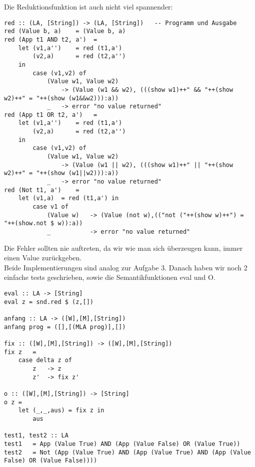\documentclass[11pt,a4paper,ngerman]{article}
\begin{document}
\begin{enumerate}[a)]
            Die Reduktionsfunktion ist auch nicht viel spannender:
            \begin{lstlisting}
red :: (LA, [String]) -> (LA, [String])   -- Programm und Ausgabe
red (Value b, a)    = (Value b, a)
red (App t1 AND t2, a')  =
    let (v1,a'')    = red (t1,a')
        (v2,a)      = red (t2,a'')
    in
        case (v1,v2) of
            (Value w1, Value w2)    
                -> (Value (w1 && w2), (((show w1)++" && "++(show w2)++" = "++(show (w1&&w2))):a))
            _   -> error "no value returned"
red (App t1 OR t2, a')   =
    let (v1,a'')    = red (t1,a')
        (v2,a)      = red (t2,a'')
    in
        case (v1,v2) of
            (Value w1, Value w2)
                -> (Value (w1 || w2), (((show w1)++" || "++(show w2)++" = "++(show (w1||w2))):a))
            _   -> error "no value returned"
red (Not t1, a')    =
    let (v1,a)  = red (t1,a') in
        case v1 of
            (Value w)   -> (Value (not w),(("not ("++(show w)++") = "++(show.not $ w)):a))
            _           -> error "no value returned"
            \end{lstlisting}
            Die Fehler sollten nie auftreten, da wir wie man sich überzeugen kann, immer einen
            Value zurückgeben.\\

            Beide Implementierungen sind analog zur Aufgabe 3. Danach haben wir noch 2 einfache
            tests geschrieben, sowie die Semantikfunktionen eval und O.

            \begin{lstlisting}
eval :: LA -> [String]
eval z = snd.red $ (z,[])

anfang :: LA -> ([W],[M],[String])
anfang prog = ([],[(MLA prog)],[])

fix :: ([W],[M],[String]) -> ([W],[M],[String])
fix z   =
    case delta z of
        z   -> z
        z'  -> fix z'

o :: ([W],[M],[String]) -> [String]
o z = 
    let (_,_,aus) = fix z in
        aus

test1, test2 :: LA
test1   = App (Value True) AND (App (Value False) OR (Value True))
test2   = Not (App (Value True) AND (App (Value True) AND (App (Value False) OR (Value False))))
            \end{lstlisting}


\end{enumerate}
\end{document}
